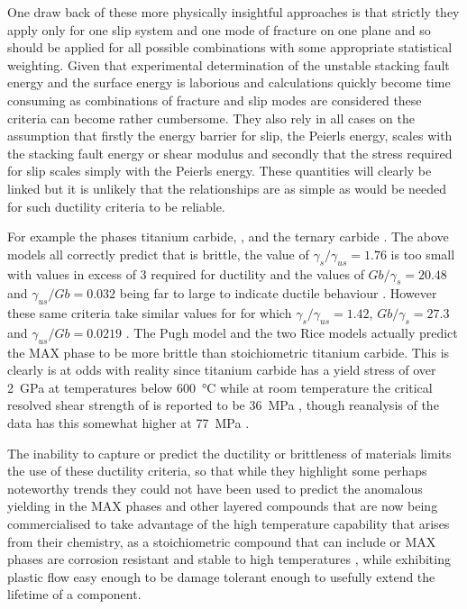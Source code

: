 One draw back of these more physically insightful approaches is that strictly they apply only for one slip system and one mode of fracture on one plane and so should be applied for all possible combinations with some appropriate statistical weighting. Given that experimental determination of the unstable stacking fault energy and the surface energy is laborious and calculations quickly become time consuming as combinations of fracture and slip modes are considered these criteria can become rather cumbersome. They also rely in all cases on the assumption that firstly the energy barrier for slip, the Peierls energy, scales with the stacking fault energy or shear modulus and secondly that the stress required for slip scales simply with the Peierls energy. These quantities will clearly be linked but it is unlikely that the relationships are as simple as would be needed for such ductility criteria to be reliable.

For example the phases titanium carbide, , and the ternary carbide . The above models all correctly predict that  is brittle, the value of $\gamma_s / \gamma_{us} = 1.76$ is too small with values in excess of 3 required for ductility \cite{Price1992,Yu2003} and the values of $Gb/\gamma_s = 20.48$ and $\gamma_{us} / Gb = 0.032$ being far to large to indicate ductile behaviour \cite{Yu2003,Medvedeva2011}. However these same criteria take similar values for  for which $\gamma_s / \gamma_{us} = 1.42$, $Gb/\gamma_s = 27.3$ and $\gamma_{us} / Gb = 0.0219$ \cite{Medvedeva2011,Farle2015}. The Pugh model and the two Rice models \cite{Pugh1954,rice1974,Rice1992} actually predict the MAX phase to be more brittle than stoichiometric titanium carbide. This is clearly is at odds with reality since titanium carbide has a yield stress of over \SI{2}{\giga\pascal} at temperatures below \SI{600}{\celsius} \cite{Miracle1983} while at room temperature the critical resolved shear strength of  is reported to be \SI{36}{\mega\pascal} \cite{Barsoum1999}, though reanalysis of the data has this somewhat higher at \SI{77}{\mega\pascal} \cite{Humphrey2012}.


The inability to capture or predict the ductility or brittleness of materials limits the use of these ductility criteria, so that while they highlight some perhaps noteworthy trends they could not have been used to predict the anomalous yielding in the MAX phases and other layered compounds that are now being commercialised to take advantage of the high temperature capability that arises from their chemistry, as a stoichiometric compound that can include  or  MAX phases are corrosion resistant and stable to high temperatures \cite{Radovic2013}, while exhibiting plastic flow easy enough to be damage tolerant enough to usefully extend the lifetime of a component.

